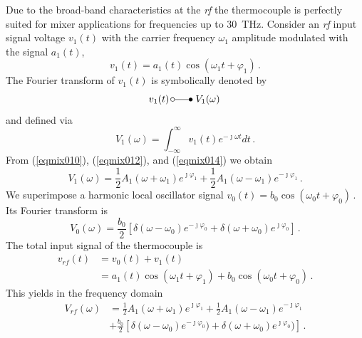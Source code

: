 \documentclass[journal]{IEEEtran}
\newcommand{\TDFD}{\unitlength1ex \begin{picture}(6.2,1.6)%
            \put(0.8,0.6){\circle{1.0}}%
            \put(1.30,0.6){\line(1,0){3.25}}    %
            \put(5.05,0.6){\circle*{1.0}}\end{picture}}
\begin{document}
Due to the broad-band characteristics at the \emph{rf} the thermocouple is perfectly suited for mixer applications for frequencies up to 30~THz. Consider an  \emph{rf} input signal voltage $v_1(t)$ with the carrier frequency $\omega_1$ amplitude modulated with the signal  $a_1(t)$,
%
\begin{equation}	\label{eqmix010}
	v_1(t) =  a_1(t)\cos(\omega_1 t +\varphi_1) \, .
\end{equation}
%
The Fourier transform of $v_1(t)$ is symbolically denoted by
%
\begin{equation}	\label{eqmix012}
	v_1(t) \TDFD V_1(\omega) \, 
\end{equation}
%
and defined via
%
\begin{equation}	\label{eqmix014}
	V_1(\omega) = \int_{-\infty}^\infty v_1(t) e^{-\jmath \omega t} dt \, .
\end{equation}
%
From (\ref{eqmix010}), (\ref{eqmix012}), and (\ref{eqmix014}) we obtain
%
\begin{equation}	\label{eqmix016}
	V_1(\omega) = \frac{1}{2} A_1(\omega+ \omega_1) e^{\jmath \varphi_1} +\frac{1}{2} A_1(\omega- \omega_1)e^{-\jmath \varphi_1}\, .
\end{equation}
%
We superimpose a harmonic local oscillator signal
%
	$v_0(t) =  b_0 \cos(\omega_0 t +\varphi_0) \, .$
%
Its Fourier transform is
%
\begin{equation}	\label{eqmix020}
	V_0(\omega) = \frac{b_0}{2}   \left[\delta(\omega - \omega_0) e^{-\jmath \varphi_0} + \delta(\omega + \omega_0) e^{\jmath \varphi_0}\right]\, .
\end{equation}
%
The total input signal of the thermocouple is
%
\begin{align}	\label{eqmix030}
	v_{rf}(t)  & = v_0(t) + v_1(t) \\
	              & = a_1(t)\cos(\omega_1 t +\varphi_1) +  b_0 \cos(\omega_0 t +\varphi_0) \, . \nonumber
\end{align}
%
This yields in the frequency domain
%
\begin{align}	\nonumber
	V_{rf}(\omega) & =  \frac{1}{2} A_1(\omega+ \omega_1) e^{\jmath \varphi_1} +\frac{1}{2} A_1(\omega- \omega_1)e^{-\jmath \varphi_1} \\  
	              &                                       +  \frac{b_0}{2}   \left[\delta(\omega - \omega_0) e^{-\jmath \varphi_0}) + \delta(\omega + \omega_0) e^{\jmath \varphi_0})\right] \, . \label{eqmix040} 
\end{align}
\end{document}
